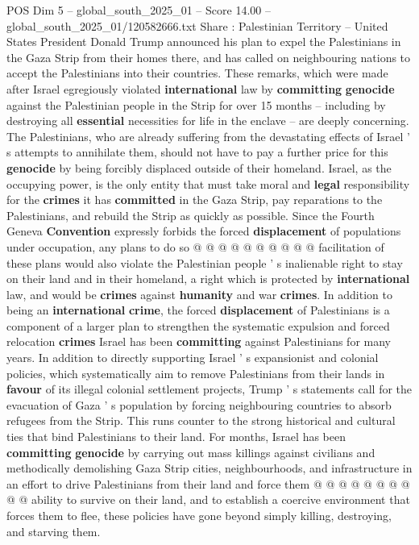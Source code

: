 \begin{textsample}{POS Dim 5 – global\_south\_2025\_01 – Score 14.00 – global\_south\_2025\_01/120582666.txt}  \label{ex:f5_pos_297}
Share : Palestinian Territory -- United States President Donald Trump announced his plan to expel the Palestinians in the Gaza Strip from their homes there, and has called on neighbouring nations to accept the Palestinians into their countries.
These remarks, which were made after Israel egregiously violated \textbf{international} law by \textbf{committing} \textbf{genocide} against the Palestinian people in the Strip for over 15 months -- including by destroying all \textbf{essential} necessities for life in the enclave -- are deeply concerning.
The Palestinians, who are already suffering from the devastating effects of Israel ' s attempts to annihilate them, should not have to pay a further price for this \textbf{genocide} by being forcibly displaced outside of their homeland.
Israel, as the occupying power, is the only entity that must take moral and \textbf{legal} responsibility for the \textbf{crimes} it has \textbf{committed} in the Gaza Strip, pay reparations to the Palestinians, and rebuild the Strip as quickly as possible.
Since the Fourth Geneva \textbf{Convention} expressly forbids the forced \textbf{displacement} of populations under occupation, any plans to do so @ @ @ @ @ @ @ @ @ @ facilitation of these plans would also violate the Palestinian people ' s inalienable right to stay on their land and in their homeland, a right which is protected by \textbf{international} law, and would be \textbf{crimes} against \textbf{humanity} and war \textbf{crimes}.
In addition to being an \textbf{international} \textbf{crime}, the forced \textbf{displacement} of Palestinians is a component of a larger plan to strengthen the systematic expulsion and forced relocation \textbf{crimes} Israel has been \textbf{committing} against Palestinians for many years.
In addition to directly supporting Israel ' s expansionist and colonial policies, which systematically aim to remove Palestinians from their lands in \textbf{favour} of its illegal colonial settlement projects, Trump ' s statements call for the evacuation of Gaza ' s population by forcing neighbouring countries to absorb refugees from the Strip.
This runs counter to the strong historical and cultural ties that bind Palestinians to their land.
For months, Israel has been \textbf{committing} \textbf{genocide} by carrying out mass killings against civilians and methodically demolishing Gaza Strip cities, neighbourhoods, and infrastructure in an effort to drive Palestinians from their land and force them @ @ @ @ @ @ @ @ @ @ ability to survive on their land, and to establish a coercive environment that forces them to flee, these policies have gone beyond simply killing, destroying, and starving them.

\end{textsample}
